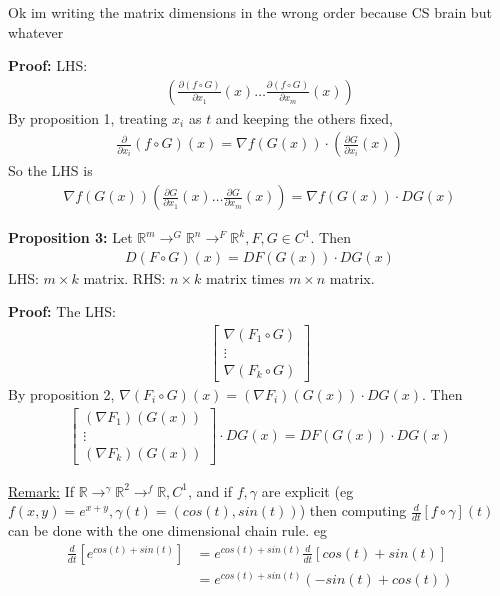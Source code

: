 \documentclass{article}
\newcommand*{\rr}{\mathbb{R}}%
\begin{document}
Ok im writing the matrix dimensions in the wrong order because CS brain but whatever

\textbf{Proof:} LHS:\begin{align*}
    (\frac{\partial (f\circ G)}{\partial x_1}(x)\dots\frac{\partial (f\circ G)}{\partial x_m}(x))
\end{align*} By proposition 1, treating $x_i$ as $t$ and keeping the others fixed, \begin{align*}
    \frac{\partial}{\partial x_i}(f\circ G)(x)=\nabla f(G(x))\cdot(\frac{\partial G}{\partial x_i}(x))
\end{align*} So the LHS is \begin{align*}
    \nabla f(G(x))(\frac{\partial G}{\partial x_1}(x)\dots \frac{\partial G}{\partial x_m}(x))=\nabla f(G(x))\cdot DG(x)
\end{align*}

\textbf{Proposition 3:} Let $\rr^m\to^G\rr^n\to^F\rr^k, F,G\in C^1$. Then \begin{align*}
    D(F\circ G)(x)=DF(G(x))\cdot DG(x)
\end{align*} LHS: $m\times k$ matrix. RHS: $n\times k$ matrix times $m\times n$ matrix.

\textbf{Proof:} The LHS:\begin{align*}
    \begin{bmatrix}
        \nabla(F_1\circ G)\\
        \vdots\\
        \nabla(F_k\circ G)
    \end{bmatrix}
\end{align*} By proposition 2, $\nabla(F_i\circ G)(x)=(\nabla F_i)(G(x))\cdot DG(x)$. Then \begin{align*}
    \begin{bmatrix}
        (\nabla F_1)(G(x))\\
        \vdots\\
        (\nabla F_k)(G(x))
    \end{bmatrix} \cdot DG(x)=DF(G(x))\cdot DG(x)
\end{align*}

\underline{Remark:} If $\rr\to^\gamma\rr^2\to^f\rr, C^1$, and if $f,\gamma$ are explicit (eg $f(x,y)=e^{x+y},\gamma(t)=(cos(t),sin(t))$) then computing $\frac{d}{dt}[f\circ \gamma](t)$ can be done with the one dimensional chain rule. eg \begin{align*}
    \frac{d}{dt}[e^{cos(t)+sin(t)}]&=e^{cos(t)+sin(t)}\frac{d}{dt}[cos(t)+sin(t)]\\
    &=e^{cos(t)+sin(t)}(-sin(t)+cos(t))
\end{align*}
\end{document}
